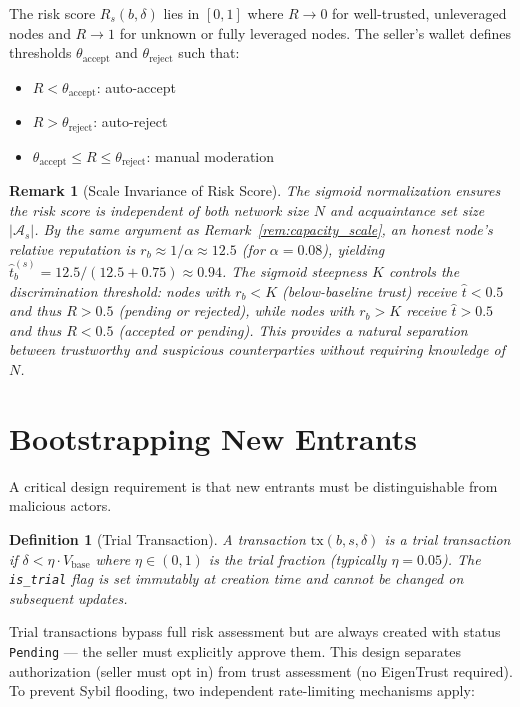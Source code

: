 \documentclass[11pt]{article}
\newtheorem{definition}[theorem]{Definition}
\newtheorem{remark}[theorem]{Remark}
\begin{document}
The risk score $R_s(b, \delta)$ lies in $[0, 1]$ where $R \to 0$ for well-trusted, unleveraged nodes and $R \to 1$ for unknown or fully leveraged nodes. The seller's wallet defines thresholds $\theta_{\text{accept}}$ and $\theta_{\text{reject}}$ such that:
\begin{itemize}
    \item $R < \theta_{\text{accept}}$: auto-accept
    \item $R > \theta_{\text{reject}}$: auto-reject
    \item $\theta_{\text{accept}} \leq R \leq \theta_{\text{reject}}$: manual moderation
\end{itemize}

\begin{remark}[Scale Invariance of Risk Score]\label{rem:risk_scale}
The sigmoid normalization ensures the risk score is independent of both network size $N$ and acquaintance set size $|\mathcal{A}_s|$. By the same argument as Remark~\ref{rem:capacity_scale}, an honest node's relative reputation is $r_b \approx 1/\alpha \approx 12.5$ (for $\alpha = 0.08$), yielding $\hat{t}^{(s)}_b = 12.5 / (12.5 + 0.75) \approx 0.94$. The sigmoid steepness $K$ controls the discrimination threshold: nodes with $r_b < K$ (below-baseline trust) receive $\hat{t} < 0.5$ and thus $R > 0.5$ (pending or rejected), while nodes with $r_b > K$ receive $\hat{t} > 0.5$ and thus $R < 0.5$ (accepted or pending). This provides a natural separation between trustworthy and suspicious counterparties without requiring knowledge of $N$.
\end{remark}

\section{Bootstrapping New Entrants}
\label{sec:bootstrap}

A critical design requirement is that new entrants must be distinguishable from malicious actors.

\begin{definition}[Trial Transaction]\label{def:trial_transaction}
A transaction $\text{tx}(b, s, \delta)$ is a \emph{trial transaction} if $\delta < \eta \cdot V_{\text{base}}$ where $\eta \in (0, 1)$ is the trial fraction (typically $\eta = 0.05$). The \texttt{is\_trial} flag is set immutably at creation time and cannot be changed on subsequent updates.
\end{definition}

Trial transactions bypass full risk assessment but are always created with status \texttt{Pending} --- the seller must explicitly approve them. This design separates authorization (seller must opt in) from trust assessment (no EigenTrust required). To prevent Sybil flooding, two independent rate-limiting mechanisms apply:
\end{document}

